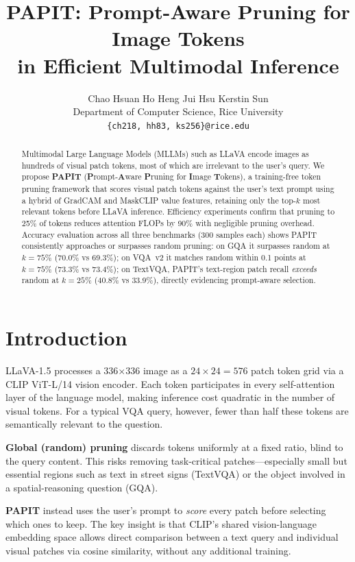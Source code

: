 \documentclass[10pt,twocolumn,letterpaper]{article}
\title{PAPIT: Prompt-Aware Pruning for Image Tokens\\
       in Efficient Multimodal Inference}
\author{%
  Chao Hsuan Ho \quad Heng Jui Hsu \quad Kerstin Sun \\
  Department of Computer Science, Rice University \\
  {\small\texttt{\{ch218, hh83, ks256\}@rice.edu}}
}
\begin{document}
\maketitle

\begin{abstract}
Multimodal Large Language Models (MLLMs) such as LLaVA encode images
as hundreds of visual patch tokens, most of which are irrelevant to the
user's query.
We propose \textbf{PAPIT} (\textbf{P}rompt-\textbf{A}ware \textbf{P}runing
for \textbf{I}mage \textbf{T}okens), a training-free token pruning framework
that scores visual patch tokens against the user's text prompt using a
hybrid of GradCAM and MaskCLIP value features, retaining only the
top-$k$ most relevant tokens before LLaVA inference.
Efficiency experiments confirm that pruning to 25\% of tokens reduces
attention FLOPs by 90\% with negligible pruning overhead.
Accuracy evaluation across all three benchmarks (300 samples each) shows
PAPIT consistently approaches or surpasses random pruning: on GQA it
surpasses random at $k{=}75\%$ (70.0\% vs 69.3\%); on VQA~v2 it
matches random within 0.1 points at $k{=}75\%$ (73.3\% vs 73.4\%);
on TextVQA, PAPIT's text-region patch recall \emph{exceeds} random at
$k{=}25\%$ (40.8\% vs 33.9\%), directly evidencing prompt-aware selection.
\end{abstract}

\section{Introduction}

LLaVA-1.5 processes a 336$\times$336 image as a $24\!\times\!24 = 576$
patch token grid via a CLIP ViT-L/14 vision encoder.
Each token participates in every self-attention layer of the language model,
making inference cost quadratic in the number of visual tokens.
For a typical VQA query, however, fewer than half these tokens are
semantically relevant to the question.

\textbf{Global (random) pruning} discards tokens uniformly at a fixed ratio,
blind to the query content.
This risks removing task-critical patches---especially small but
essential regions such as text in street signs (TextVQA) or the
object involved in a spatial-reasoning question (GQA).

\textbf{PAPIT} instead uses the user's prompt to \emph{score} every patch
before selecting which ones to keep.
The key insight is that CLIP's shared vision-language embedding space allows
direct comparison between a text query and individual visual patches via
cosine similarity, without any additional training.
\end{document}
